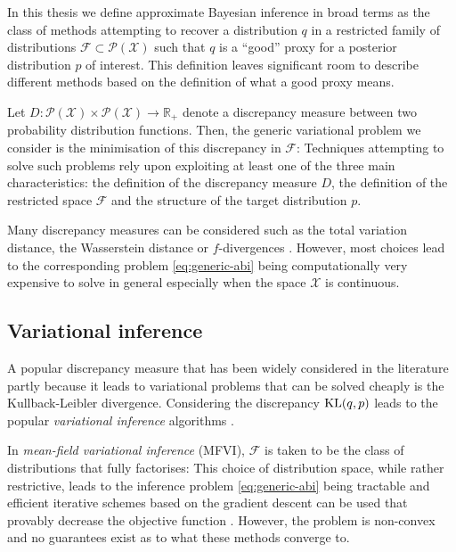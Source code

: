 
In this thesis we define approximate Bayesian inference in broad terms as the class of methods attempting to recover a distribution $q$ in a restricted family of distributions $\mathcal F\subset \mathcal P(\mathcal X)$ such that $q$ is a ``good'' proxy for a posterior distribution $p$ of interest. 
This definition leaves significant room to describe different methods based on the definition of what a good proxy means. 

Let $D:\mathcal P(\mathcal X)\times \mathcal P(\mathcal X)\to \mathbb R_{+}$ denote a discrepancy measure between two probability distribution functions. Then, the generic variational problem we consider is the minimisation of this discrepancy in $\mathcal F$:
%
%
Techniques attempting to solve such problems rely upon exploiting at least one of the three main characteristics: the definition of the discrepancy measure $D$, the definition of the restricted space $\mathcal F$ and the structure of the target distribution $p$. 

Many discrepancy measures can be considered such as the total variation distance, the Wasserstein distance or $f$-divergences \citep{minka04, blei16, li16, bernton17}. However, most choices lead to the corresponding problem \eqref{eq:generic-abi} being computationally very expensive to solve in general especially when the space $\mathcal X$ is continuous.
\subsection{Variational inference}
A popular discrepancy measure that has been widely considered in the literature partly because it leads to variational problems that can be solved cheaply is the Kullback-Leibler divergence. Considering the discrepancy $\mathrm{KL}\!\left(q,p\right)$ leads to the popular \emph{variational inference} algorithms \citep{blei16}. 


In \emph{mean-field variational inference} (MFVI), $\mathcal F$ is taken to be the class of distributions that fully factorises:
%
% 
This choice of distribution space, while rather restrictive, leads to the inference problem \eqref{eq:generic-abi} being tractable and efficient iterative schemes based on the gradient descent can be used that provably decrease the objective function \citep{hoffman13, kucukelbir16, blei16}. However, the problem is non-convex and no guarantees exist as to what these methods converge to.

